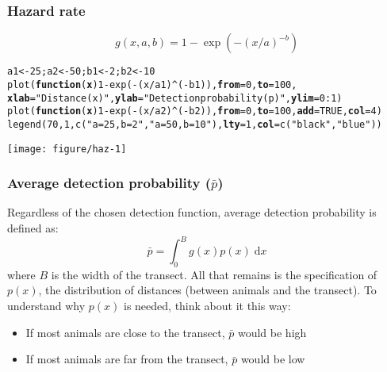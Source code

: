 \documentclass[color=usenames,dvipsnames]{beamer}\usepackage[]{graphicx}\usepackage[]{color}
\makeatletter
\newcommand{\hlnum}[1]{\textcolor[rgb]{0.69,0.494,0}{#1}}%
\newcommand{\hlstr}[1]{\textcolor[rgb]{0.749,0.012,0.012}{#1}}%
\newcommand{\hlopt}[1]{\textcolor[rgb]{0,0,0}{#1}}%
\newcommand{\hlstd}[1]{\textcolor[rgb]{0,0,0}{#1}}%
\newcommand{\hlkwa}[1]{\textcolor[rgb]{0,0,0}{\textbf{#1}}}%
\newcommand{\hlkwb}[1]{\textcolor[rgb]{0,0.341,0.682}{#1}}%
\newcommand{\hlkwc}[1]{\textcolor[rgb]{0,0,0}{\textbf{#1}}}%
\newcommand{\hlkwd}[1]{\textcolor[rgb]{0.004,0.004,0.506}{#1}}%
\newenvironment{kframe}{%
 \def\at@end@of@kframe{}%
 \ifinner\ifhmode%
  \def\at@end@of@kframe{\end{minipage}}%
  \begin{minipage}{\columnwidth}%
 \fi\fi%
 \def\FrameCommand##1{\hskip\@totalleftmargin \hskip-\fboxsep
 \colorbox{shadecolor}{##1}\hskip-\fboxsep
     \hskip-\linewidth \hskip-\@totalleftmargin \hskip\columnwidth}%
 \MakeFramed {\advance\hsize-\width
   \@totalleftmargin\z@ \linewidth\hsize
   \@setminipage}}%
 {\par\unskip\endMakeFramed%
 \at@end@of@kframe}
\newenvironment{knitrout}{}{} %
\makeatother
\begin{document}
\begin{frame}[fragile]
  \frametitle{Hazard rate}
  \footnotesize
  \[
    g(x,a,b) = 1-\exp(-(x/a)^{-b})
  \]
  \vspace{-12pt}
  \centering
\begin{knitrout}\scriptsize
{}\color{fgcolor}\begin{kframe}
\begin{alltt}
\hlstd{a1} \hlkwb{<-} \hlnum{25}\hlstd{; a2} \hlkwb{<-} \hlnum{50}\hlstd{; b1} \hlkwb{<-} \hlnum{2}\hlstd{; b2} \hlkwb{<-} \hlnum{10}
\hlkwd{plot}\hlstd{(}\hlkwa{function}\hlstd{(}\hlkwc{x}\hlstd{)} \hlnum{1}\hlopt{-}\hlkwd{exp}\hlstd{(}\hlopt{-}\hlstd{(x}\hlopt{/}\hlstd{a1)}\hlopt{^}\hlstd{(}\hlopt{-}\hlstd{b1)),} \hlkwc{from}\hlstd{=}\hlnum{0}\hlstd{,} \hlkwc{to}\hlstd{=}\hlnum{100}\hlstd{,}
     \hlkwc{xlab}\hlstd{=}\hlstr{"Distance (x)"}\hlstd{,} \hlkwc{ylab}\hlstd{=}\hlstr{"Detection probability (p)"}\hlstd{,} \hlkwc{ylim}\hlstd{=}\hlnum{0}\hlopt{:}\hlnum{1}\hlstd{)}
\hlkwd{plot}\hlstd{(}\hlkwa{function}\hlstd{(}\hlkwc{x}\hlstd{)} \hlnum{1}\hlopt{-}\hlkwd{exp}\hlstd{(}\hlopt{-}\hlstd{(x}\hlopt{/}\hlstd{a2)}\hlopt{^}\hlstd{(}\hlopt{-}\hlstd{b2)),} \hlkwc{from}\hlstd{=}\hlnum{0}\hlstd{,} \hlkwc{to}\hlstd{=}\hlnum{100}\hlstd{,} \hlkwc{add}\hlstd{=}\hlnum{TRUE}\hlstd{,} \hlkwc{col}\hlstd{=}\hlnum{4}\hlstd{)}
\hlkwd{legend}\hlstd{(}\hlnum{70}\hlstd{,} \hlnum{1}\hlstd{,} \hlkwd{c}\hlstd{(}\hlstr{"a=25, b=2"}\hlstd{,} \hlstr{"a=50, b=10"}\hlstd{),} \hlkwc{lty}\hlstd{=}\hlnum{1}\hlstd{,} \hlkwc{col}\hlstd{=}\hlkwd{c}\hlstd{(}\hlstr{"black"}\hlstd{,}\hlstr{"blue"}\hlstd{))}
\end{alltt}
\end{kframe}
\texttt{[image: figure/haz-1]} 
\end{knitrout}
\end{frame}



\begin{frame}
  \frametitle{Average detection probability ($\bar{p}$)}
  Regardless of the chosen detection function, average detection
  probability is defined as: 
  \[
     \bar{p} = \int_{0}^{B} g(x)p(x) \; \mathrm{d}x
   \]
   where $B$ is the width of the transect.
  \pause
  \vfill
  All that remains is the specification of $p(x)$, the
  distribution of distances (between animals and the transect).
  \pause
  \vfill
  To understand why $p(x)$ is needed, think about it this way:
  \begin{itemize}
    \item If most animals are close to the transect, $\bar{p}$ would
      be high
    \item If most animals are far from the transect, $\bar{p}$ would
      be low
  \end{itemize}
\end{frame}
\end{document}
